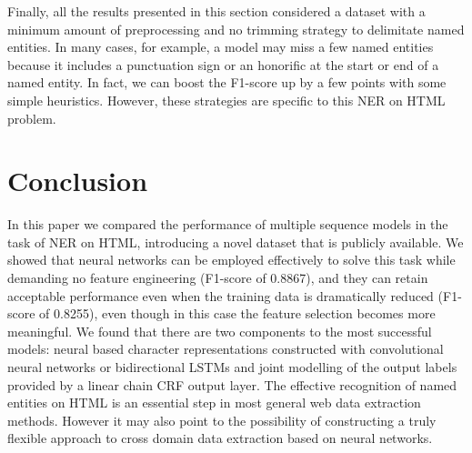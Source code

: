 \documentclass[sigconf]{acmart}
\begin{document}
Finally, all the results presented in this section considered a dataset with a minimum
amount of preprocessing and no trimming strategy to delimitate named entities. In many cases, 
for example, a model may miss a few named entities because it includes a punctuation sign
or an honorific at the start or end of a named entity. In fact, we can boost the F1-score up
by a few points with some simple heuristics. However, these strategies are specific to this
NER on HTML problem.

\section{Conclusion}

In this paper we compared the performance of multiple sequence models in the task of
NER on HTML, introducing a novel dataset that is publicly available. We showed that
neural networks can be employed effectively to solve this task while demanding no 
feature engineering (F1-score of 0.8867), and they can retain acceptable performance 
even when the training data is dramatically reduced (F1-score of 0.8255), even though 
in this case the feature selection becomes more meaningful. We found that there are 
two components to the most successful models: neural based character representations
constructed with convolutional neural networks or bidirectional LSTMs and joint modelling 
of the output labels provided by a linear chain CRF output layer. The effective recognition 
of named entities on HTML is an essential step in most general web data extraction methods. 
However it may also point to the possibility of constructing a truly flexible approach to
cross domain data extraction based on neural networks.



\end{document}
